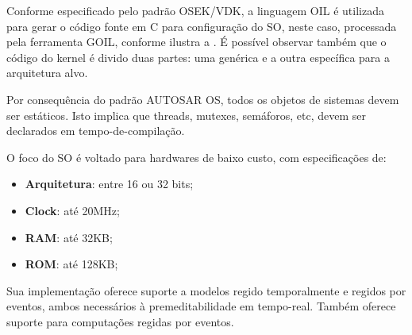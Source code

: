 Conforme especificado pelo padrão OSEK/VDK, a linguagem OIL é utilizada para gerar o código fonte em C para configuração do SO, neste caso, processada pela ferramenta GOIL, conforme ilustra a . É possível observar também que o código do kernel é divido duas partes: uma genérica e a outra específica para a arquitetura alvo.


Por consequência do padrão AUTOSAR OS, todos os objetos de sistemas devem ser estáticos. Isto implica que threads, mutexes, semáforos, etc, devem ser declarados em tempo-de-compilação.

O foco do SO é voltado para hardwares de baixo custo, com especificações de:
\begin{itemize}
	\item \textbf{Arquitetura}: entre 16 ou 32 bits;
	\item \textbf{Clock}: até 20MHz;
	\item \textbf{RAM}: até 32KB;
	\item \textbf{ROM}:	até 128KB;	
\end{itemize}

Sua implementação oferece suporte a modelos regido temporalmente e regidos por eventos, ambos necessários à premeditabilidade em tempo-real. Também oferece suporte para computações regidas por eventos.